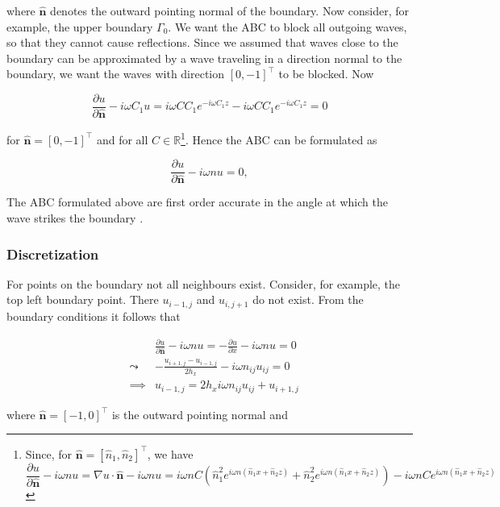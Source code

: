 \documentclass[10pt,a4paper]{article}
\newcommand{\n}{\mathbf{n}}
\begin{document}
where $\hat{\n}$ denotes the outward pointing normal of the boundary. Now consider, for example, the upper boundary $\Gamma_0$. We want the ABC to block all outgoing waves, so that they cannot cause reflections. Since we assumed that waves close to the boundary can be approximated by a wave traveling in a direction normal to the boundary, we want the waves with direction $[0,-1]^\top$ to be blocked. Now

\begin{equation}
\frac{\partial u}{\partial \hat{\n}} -i\omega C_1 u = i\omega CC_1e^{-i\omega C_1z} - i\omega CC_1e^{-i \omega C_1 z} = 0
\end{equation}

for $\hat{\n}=[0,-1]^\top$ and for all $C\in\mathbb{R}$\footnote{Since, for $\hat{\n} = [\hat{n}_1,\hat{n}_2]^\top$, we have 
	\begin{equation*}
	\frac{\partial u}{\partial \hat{\n}} -i\omega nu= \nabla u\cdot \hat{\n} -i\omega nu= i\omega nC (\hat{n}_1^2 e^{i\omega n(\hat{n}_1x+\hat{n}_2z)} + \hat{n}_2^2e^{i\omega n(\hat{n}_1x+\hat{n}_2z)})-i\omega nCe^{i\omega n(\hat{n}_1x+\hat{n}_2z)}
	\end{equation*}}. Hence the ABC can be formulated as

\begin{equation}
\frac{\partial u}{\partial \hat{\n}} - i\omega nu=0,
\end{equation}

The ABC formulated above are first order accurate in the angle at which the wave strikes the boundary \cite{AbsorpationRates}.

\subsubsection{Discretization}
For points on the boundary not all neighbours exist. Consider, for example, the top left boundary point. There $u_{i-1,j}$ and $u_{i,j+1}$ do not exist. From the boundary conditions it follows that

\begin{eqnarray}
&& \frac{\partial u}{\partial \hat{\n}} - i\omega nu = -\frac{\partial u}{\partial x} - i\omega nu =0\\
&\leadsto& -\frac{u_{i+1,j}-u_{i-1,j}}{2h_x}-i\omega n_{ij} u_{ij}=0\\
&\implies& u_{i-1,j} = 2h_xi\omega n_{ij}u_{ij}+u_{i+1,j}
\end{eqnarray}

where $\hat{\n}=[-1,0]^\top$ is the outward pointing normal and 
\end{document}
